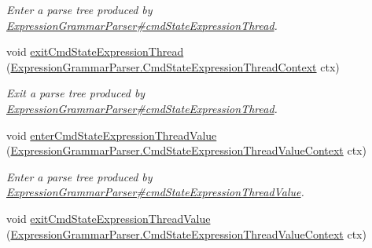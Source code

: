 \begin{DoxyCompactItemize}
\begin{DoxyCompactList}\small\item\em Enter a parse tree produced by \hyperlink{classgov_1_1nasa_1_1jpf_1_1inspector_1_1server_1_1expression_1_1parser_1_1_expression_grammar_parser_aa1d5db45ac1bf7eceb29571e40f51853}{Expression\+Grammar\+Parser\#cmd\+State\+Expression\+Thread}. \end{DoxyCompactList}\item 
void \hyperlink{interfacegov_1_1nasa_1_1jpf_1_1inspector_1_1server_1_1expression_1_1parser_1_1_expression_grammar_listener_a01a6bb0486afd26faf80bc31e0eab3fa}{exit\+Cmd\+State\+Expression\+Thread} (\hyperlink{classgov_1_1nasa_1_1jpf_1_1inspector_1_1server_1_1expression_1_1parser_1_1_expression_grammar_paf34f6c6cf6d3cef851c12971caa03ed5}{Expression\+Grammar\+Parser.\+Cmd\+State\+Expression\+Thread\+Context} ctx)
\begin{DoxyCompactList}\small\item\em Exit a parse tree produced by \hyperlink{classgov_1_1nasa_1_1jpf_1_1inspector_1_1server_1_1expression_1_1parser_1_1_expression_grammar_parser_aa1d5db45ac1bf7eceb29571e40f51853}{Expression\+Grammar\+Parser\#cmd\+State\+Expression\+Thread}. \end{DoxyCompactList}\item 
void \hyperlink{interfacegov_1_1nasa_1_1jpf_1_1inspector_1_1server_1_1expression_1_1parser_1_1_expression_grammar_listener_a988e53b9bafdfdb216de11c0034ceba5}{enter\+Cmd\+State\+Expression\+Thread\+Value} (\hyperlink{classgov_1_1nasa_1_1jpf_1_1inspector_1_1server_1_1expression_1_1parser_1_1_expression_grammar_pa5a19a4a13564890289bc65b6a0372f78}{Expression\+Grammar\+Parser.\+Cmd\+State\+Expression\+Thread\+Value\+Context} ctx)
\begin{DoxyCompactList}\small\item\em Enter a parse tree produced by \hyperlink{classgov_1_1nasa_1_1jpf_1_1inspector_1_1server_1_1expression_1_1parser_1_1_expression_grammar_parser_aa83127fe4f65f96d5da73e78c7bbae2f}{Expression\+Grammar\+Parser\#cmd\+State\+Expression\+Thread\+Value}. \end{DoxyCompactList}\item 
void \hyperlink{interfacegov_1_1nasa_1_1jpf_1_1inspector_1_1server_1_1expression_1_1parser_1_1_expression_grammar_listener_a2121914fe4845044337cb876929deb41}{exit\+Cmd\+State\+Expression\+Thread\+Value} (\hyperlink{classgov_1_1nasa_1_1jpf_1_1inspector_1_1server_1_1expression_1_1parser_1_1_expression_grammar_pa5a19a4a13564890289bc65b6a0372f78}{Expression\+Grammar\+Parser.\+Cmd\+State\+Expression\+Thread\+Value\+Context} ctx)

\end{DoxyCompactItemize}
